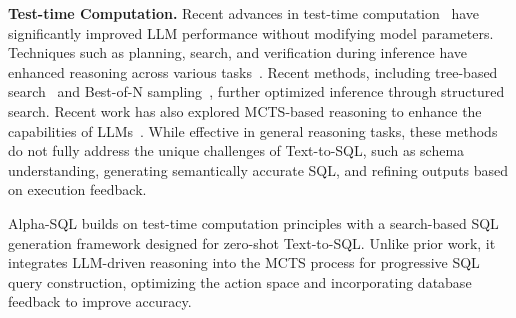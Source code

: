 \textbf{Test-time Computation.}
Recent advances in test-time computation~\cite{snell2024scalingllmtesttimecompute} have significantly improved LLM performance without modifying model parameters. Techniques such as planning, search, and verification during inference have enhanced reasoning across various tasks~\cite{cot, tot, treebon, rap, zhang2024aflow, teng2025atom}. 
Recent methods, including tree-based search~\cite{tot} and Best-of-N sampling~\cite{treebon}, further optimized inference through structured search.
Recent work has also explored MCTS-based reasoning to enhance the capabilities of LLMs~\cite{qi2024mutualreasoningmakessmaller}. While effective in general reasoning tasks, these methods do not fully address the unique challenges of Text-to-SQL, such as schema understanding, generating semantically accurate SQL, and refining outputs based on execution feedback.

Alpha-SQL builds on test-time computation principles with a search-based SQL generation framework designed for zero-shot Text-to-SQL. Unlike prior work, it integrates LLM-driven reasoning into the MCTS process for progressive SQL query construction, optimizing the action space and incorporating database feedback to improve accuracy.

